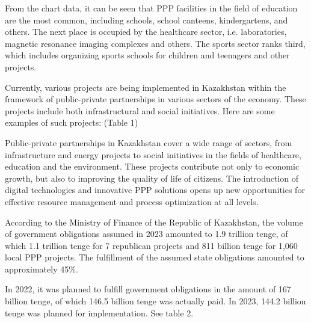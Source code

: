 \begin{multicols}{2}
From the chart data, it can be seen that PPP facilities in the field of
education are the most common, including schools, school canteens,
kindergartens, and others. The next place is occupied by the healthcare
sector, i.e. laboratories, magnetic resonance imaging complexes and
others. The sports sector ranks third, which includes organizing sports
schools for children and teenagers and other projects.

Currently, various projects are being implemented in Kazakhstan within
the framework of public-private partnerships in various sectors of the
economy. These projects include both infrastructural and social
initiatives. Here are some examples of such projects: (Table 1)

Public-private partnerships in Kazakhstan cover a wide range of sectors,
from infrastructure and energy projects to social initiatives in the
fields of healthcare, education and the environment. These projects
contribute not only to economic growth, but also to improving the
quality of life of citizens. The introduction of digital technologies
and innovative PPP solutions opens up new opportunities for effective
resource management and process optimization at all levels.

According to the Ministry of Finance of the Republic of Kazakhstan, the
volume of government obligations assumed in 2023 amounted to 1.9
trillion tenge, of which 1.1 trillion tenge for 7 republican projects
and 811 billion tenge for 1,060 local PPP projects. The fulfillment of
the assumed state obligations amounted to approximately 45\%.

In 2022, it was planned to fulfill government obligations in the amount
of 167 billion tenge, of which 146.5 billion tenge was actually paid. In
2023, 144.2 billion tenge was planned for implementation. See table 2.
\end{multicols}

